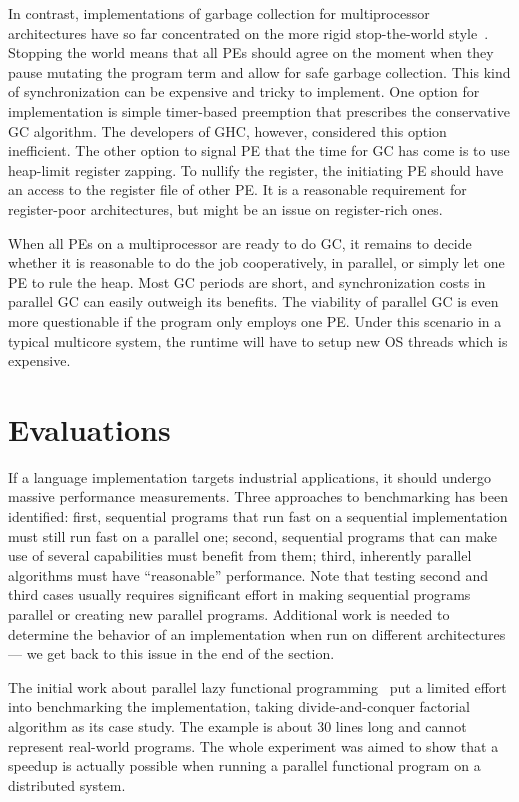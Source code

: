 \documentclass[11pt]{extarticle}
\begin{document}
In contrast, implementations of garbage collection for multiprocessor architectures have so far concentrated on the more rigid stop-the-world style~\cite{Marlow09}. Stopping the world means that all PEs should agree on the moment when they pause mutating the program term and allow for safe garbage collection. This kind of synchronization can be expensive and tricky to implement. One option for implementation is simple timer-based preemption that prescribes the conservative GC algorithm. The developers of GHC, however, considered this option inefficient. The other option to signal PE that the time for GC has come is to use heap-limit register zapping. To nullify the register, the initiating PE should have an access to the register file of other PE. It is a reasonable requirement for register-poor architectures, but might be an issue on register-rich ones.

When all PEs on a multiprocessor are ready to do GC, it remains to decide whether it is reasonable to do the job cooperatively, in parallel, or simply let one PE to rule the heap. Most GC periods are short, and synchronization costs in parallel GC can easily outweigh its benefits. The viability of parallel GC is even more questionable if the program only employs one PE. Under this scenario in a typical multicore system, the runtime will have to setup new OS threads which is expensive.

\section{Evaluations}

If a language implementation targets industrial applications, it should undergo massive performance measurements. Three approaches to benchmarking has been identified: first, sequential programs that run fast on a sequential implementation must still run fast on a parallel one; second, sequential programs that can make use of several capabilities must benefit from them; third, inherently parallel algorithms must have ``reasonable'' performance. Note that testing second and third cases usually requires significant effort in making sequential programs parallel or creating new parallel programs. Additional work is needed to determine the behavior of an implementation when run on different architectures — we get back to this issue in the end of the section.

The initial work about parallel lazy functional programming~\cite{Trinder96} put a limited effort into benchmarking the implementation, taking divide-and-conquer factorial algorithm as its case study. The example is about 30 lines long and cannot represent real-world programs. The whole experiment was aimed to show that a speedup is actually possible when running a parallel functional program on a distributed system.
\end{document}
